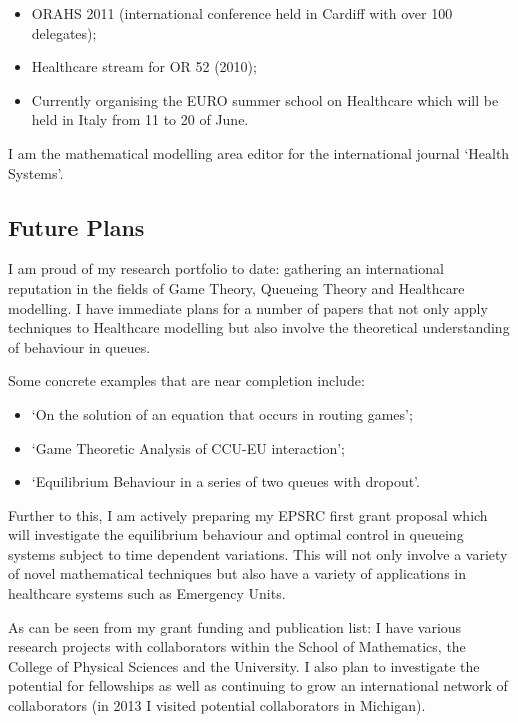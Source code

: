 \documentclass{article}
\begin{document}
\begin{itemize}
    \item ORAHS 2011 (international conference held in Cardiff with over 100 delegates);
    \item Healthcare stream for OR 52 (2010);
    \item Currently organising the EURO summer school on Healthcare which will be held in Italy from 11 to 20 of June.
\end{itemize}

I am the mathematical modelling area editor for the international journal `Health Systems'.

\subsection{Future Plans}

I am proud of my research portfolio to date: gathering an international reputation in the fields of Game Theory, Queueing Theory and Healthcare modelling.
I have immediate plans for a number of papers that not only apply techniques to Healthcare modelling but also involve the theoretical understanding of behaviour in queues.

Some concrete examples that are near completion include:

\begin{itemize}
    \item `On the solution of an equation that occurs in routing games';
    \item `Game Theoretic Analysis of CCU-EU interaction';
    \item `Equilibrium Behaviour in a series of two queues with dropout'.
\end{itemize}

Further to this, I am actively preparing my EPSRC first grant proposal which will investigate the equilibrium behaviour and optimal control in queueing systems subject to time dependent variations.
This will not only involve a variety of novel mathematical techniques but also have a variety of applications in healthcare systems such as Emergency Units.

As can be seen from my grant funding and publication list: I have various research projects with collaborators within the School of Mathematics, the College of Physical Sciences and the University.
I also plan to investigate the potential for fellowships as well as continuing to grow an international network of collaborators (in 2013 I visited potential collaborators in Michigan).
\end{document}
